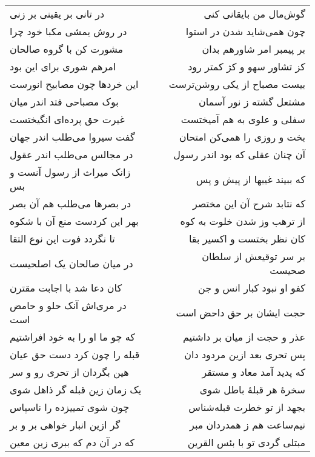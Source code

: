 \begin{center}
\begin{longtable}{l p{0.5cm} r}
در تانی بر یقینی بر زنی
&&
گوش‌مال من بایقانی کنی
\\
در روش یمشی مکبا خود چرا
&&
چون همی‌شاید شدن در استوا
\\
مشورت کن با گروه صالحان
&&
بر پیمبر امر شاورهم بدان
\\
امرهم شوری برای این بود
&&
کز تشاور سهو و کژ کمتر رود
\\
این خردها چون مصابیح انورست
&&
بیست مصباح از یکی روشن‌ترست
\\
بوک مصباحی فتد اندر میان
&&
مشتعل گشته ز نور آسمان
\\
غیرت حق پرده‌ای انگیختست
&&
سفلی و علوی به هم آمیختست
\\
گفت سیروا می‌طلب اندر جهان
&&
بخت و روزی را همی‌کن امتحان
\\
در مجالس می‌طلب اندر عقول
&&
آن چنان عقلی که بود اندر رسول
\\
زانک میراث از رسول آنست و بس
&&
که ببیند غیبها از پیش و پس
\\
در بصرها می‌طلب هم آن بصر
&&
که نتابد شرح آن این مختصر
\\
بهر این کردست منع آن با شکوه
&&
از ترهب وز شدن خلوت به کوه
\\
تا نگردد فوت این نوع التقا
&&
کان نظر بختست و اکسیر بقا
\\
در میان صالحان یک اصلحیست
&&
بر سر توقیعش از سلطان صحیست
\\
کان دعا شد با اجابت مقترن
&&
کفو او نبود کبار انس و جن
\\
در مری‌اش آنک حلو و حامض است
&&
حجت ایشان بر حق داحض است
\\
که چو ما او را به خود افراشتیم
&&
عذر و حجت از میان بر داشتیم
\\
قبله را چون کرد دست حق عیان
&&
پس تحری بعد ازین مردود دان
\\
هین بگردان از تحری رو و سر
&&
که پدید آمد معاد و مستقر
\\
یک زمان زین قبله گر ذاهل شوی
&&
سخرهٔ هر قبلهٔ باطل شوی
\\
چون شوی تمییزده را ناسپاس
&&
بجهد از تو خطرت قبله‌شناس
\\
گر ازین انبار خواهی بر و بر
&&
نیم‌ساعت هم ز همدردان مبر
\\
که در آن دم که ببری زین معین
&&
مبتلی گردی تو با بئس القرین
\\
\end{longtable}
\end{center}

